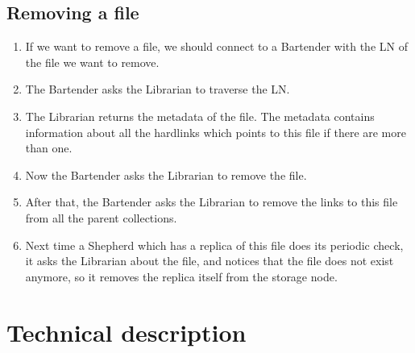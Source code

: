 \documentclass{book}
\begin{document}
\section{Removing a file} %
\label{sec:removing_a_file}

\begin{figure}[ht]
\end{figure}
\begin{enumerate}
    \item If we want to remove a file, we should connect to a Bartender with the LN of the file we want to remove.
    \item The Bartender asks the Librarian to traverse the LN.
    \item The Librarian returns the metadata of the file. The metadata contains information about all the hardlinks which points to this file if there are more than one.
    \item Now the Bartender asks the Librarian to remove the file.
    \item After that, the Bartender asks the Librarian to remove the links to this file from all the parent collections.
    \item Next time a Shepherd which has a replica of this file does its periodic check, it asks the Librarian about the file, and notices that the file does not exist anymore, so it removes the replica itself from the storage node.
\end{enumerate}




\chapter{Technical description} %
\label{cha:technical_description}
\end{document}
